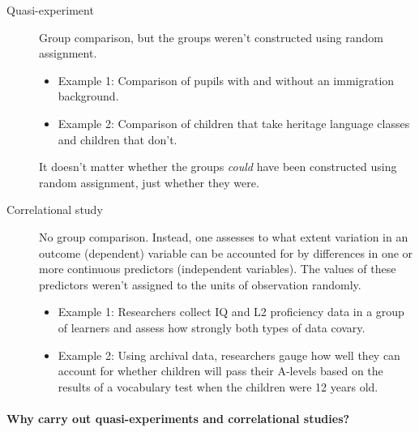 \documentclass[a4paper]{tufte-book}\usepackage[]{graphicx}\usepackage[]{xcolor}
\begin{document}
\medskip

\begin{description}
  \item[Quasi-experiment] Group comparison, but the groups weren't constructed using random assignment.
  \begin{itemize}
   \item Example 1: Comparison of pupils with and
      without an immigration background.
   \item Example 2: Comparison of children that take
      heritage language classes and children that don't.
  \end{itemize}

  It doesn't matter whether the groups \emph{could} have
  been constructed using random assignment, just whether they were.

  \item[Correlational study] No group comparison.
  Instead, one assesses to what extent variation in
    an outcome (dependent) variable can be accounted
    for by differences in one or more continuous predictors (independent variables).
    The values of these predictors weren't assigned to the units of observation
    randomly.

  \begin{itemize}
   \item Example 1: Researchers collect IQ and
    L2 proficiency data in a group of learners and
    assess how strongly both types of data covary.

   \item Example 2: Using archival data,
    researchers gauge how well they can account for whether
      children will pass their A-levels based on the results of a
      vocabulary test when the children were 12 years old.
  \end{itemize}
\end{description}

\paragraph{Why carry out quasi-experiments and correlational studies?}
\end{document}
